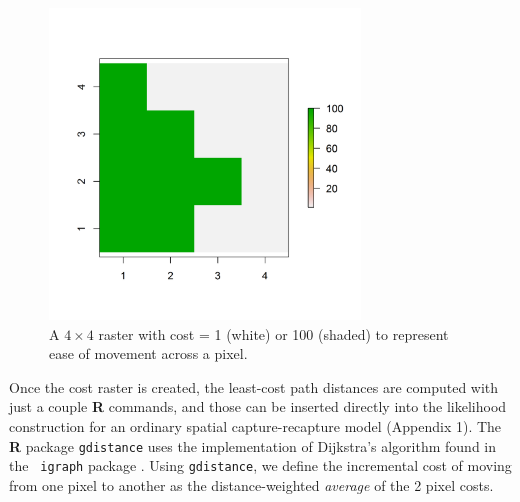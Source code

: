 \documentclass[12pt]{article}
\begin{document}
\begin{spacing}{1.2}
\begin{figure}
\begin{center}
\includegraphics[height=3.25in,width=3.25in]{figs/raster_2values}
\end{center}
\caption{A $4 \times 4$ raster with cost = 1 (white) or 100 (shaded) to represent ease of movement across a pixel.}
\label{ecoldist.fig.raster}
\end{figure}

Once the cost raster is created, the
least-cost path distances are computed with just a couple {\bf R}
commands, and those can be inserted directly into the likelihood
construction for an ordinary spatial capture-recapture model (Appendix
1). The {\bf R} package \mbox{\tt gdistance} uses the implementation
of Dijkstra's algorithm \citep{dijkstra:1959} found in the \mbox{\tt
  igraph} package \citep{csardi:2010}.  Using \mbox{\tt gdistance},
we define the incremental cost of moving from one pixel
to another as the distance-weighted {\it average} of the 2 pixel
costs.


\end{spacing}
\end{document}
